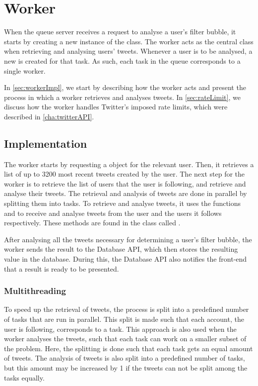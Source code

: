 \chapter{Worker}\label{workerLabel}
When the queue server receives a request to analyse a user's filter bubble, it
starts by creating a new instance of the  class. The worker
acts as the central class when retrieving and analysing users' tweets.
Whenever a user is to be analysed, a new  is created for that
task. As such, each task in the queue corresponds to a single worker.\nl

In \autoref{sec:workerImpl}, we start by describing how the worker acts
and present the process in which a worker retrieves and analyses tweets.
In \autoref{sec:rateLimit}, we discuss how the worker handles Twitter's
imposed rate limits, which were described in \autoref{cha:twitterAPI}.

\section{Implementation}\label{sec:workerImpl}
The worker starts by requesting a  object for the relevant user.
Then, it retrieves a list of up to 3200 most recent tweets created by the user.
The next step for the worker is to retrieve the list of users that the user is
following, and retrieve and analyse their tweets. The retrieval and analysis of
tweets are done in parallel by splitting them into tasks. To retrieve and
analyse tweets, it uses the functions
 and 
to receive and analyse tweets from the user and the users it follows
respectively. These methods are found in the class called
.\nl

After analysing all the tweets necessary for determining a user's filter bubble,
the worker sends the result to the Database \ac{API}, which then stores the
resulting value in the database. During this, the Database \ac{API} also
notifies the front-end that a result is ready to be presented.

\subsection{Multithreading}\label{sec:taskSplit}
To speed up the retrieval of tweets, the process is split into a predefined
number of tasks that are run in parallel. This split is made such that each
account, the user is following, corresponds to a task. This approach is also
used when the worker analyses the tweets, such that each task can work on a
smaller subset of the problem. Here, the splitting is done such that each task
gets an equal amount of tweets. The analysis of tweets is also split into a
predefined number of tasks, but this amount may be increased by 1 if the
tweets can not be split among the tasks equally.

